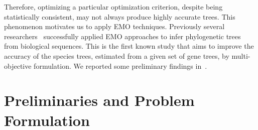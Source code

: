 Therefore, optimizing a particular optimization criterion, despite being statistically consistent, may not always produce highly accurate trees. This phenomenon motivates us to apply EMO techniques. 
Previously several researchers~\cite{villalobos2018memetic, santander2016performance, zambrano2016mo} successfully applied EMO approaches to infer phylogenetic trees from biological sequences. This is the first known study that aims to improve the accuracy of the species trees, estimated from a given set of gene trees, by multi-objective formulation. We reported some preliminary findings in~\cite{nayeem2020multi}.

 \section{Preliminaries and Problem Formulation}




